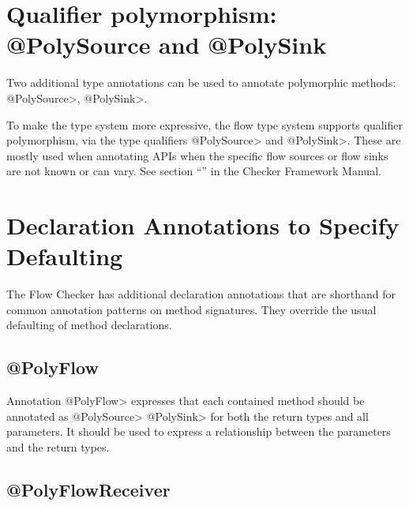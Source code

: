 \section{Qualifier polymorphism: @PolySource  and @PolySink \label{sec:polyflowsources}}

Two additional type annotations can be used to annotate polymorphic
methods: \<@PolySource>, \<@PolySink>.

To make the type system more expressive, the flow type system supports
qualifier polymorphism, via the type qualifiers \<@PolySource> and
\<@PolySink>.  These are mostly used when annotating APIs when the
specific flow sources or flow sinks are not known or can vary. 
See section ``'' in the Checker Framework Manual.  




\section{Declaration Annotations to Specify Defaulting\label{sec:addtionalanno}}

The Flow Checker has additional declaration annotations that are shorthand for common 
annotation patterns on method signatures.   They override the usual defaulting of method declarations.

\subsection{@PolyFlow\label{sec:polyflow}}

Annotation \<@PolyFlow> expresses that each contained method should be annotated as \<@PolySource> 
\<@PolySink> for both the return types and all parameters. It should be used to express a relationship 
between the parameters and the return types.


\subsection{@PolyFlowReceiver\label{sec:polyflowreceiver}}

